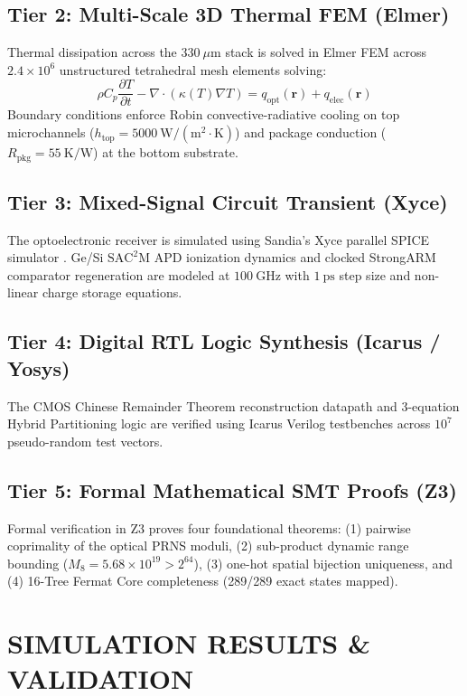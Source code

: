 \documentclass[journal]{IEEEtran}
\begin{document}
\subsection{Tier 2: Multi-Scale 3D Thermal FEM (Elmer)}
Thermal dissipation across the $330~\mu\mathrm{m}$ stack is solved in Elmer FEM \cite{Raback2013} across $2.4 \times 10^6$ unstructured tetrahedral mesh elements solving:
\begin{equation}
    \rho C_p \frac{\partial T}{\partial t} - \nabla \cdot (\kappa(T) \nabla T) = q_{\mathrm{opt}}(\mathbf{r}) + q_{\mathrm{elec}}(\mathbf{r})
\end{equation}
Boundary conditions enforce Robin convective-radiative cooling on top microchannels ($h_{\mathrm{top}} = 5000~\mathrm{W/(m^2\cdot K)}$) and package conduction ($R_{\mathrm{pkg}} = 55~\mathrm{K/W}$) at the bottom substrate.

\subsection{Tier 3: Mixed-Signal Circuit Transient (Xyce)}
The optoelectronic receiver is simulated using Sandia's Xyce parallel SPICE simulator \cite{Hutchinson2002}. Ge/Si $\mathrm{SAC^2M}$ APD ionization dynamics and clocked StrongARM comparator regeneration \cite{Razavi2015} are modeled at $100~\mathrm{GHz}$ with $1~\mathrm{ps}$ step size and non-linear charge storage equations.

\subsection{Tier 4: Digital RTL Logic Synthesis (Icarus / Yosys)}
The CMOS Chinese Remainder Theorem reconstruction datapath and 3-equation Hybrid Partitioning logic are verified using Icarus Verilog testbenches across $10^7$ pseudo-random test vectors.

\subsection{Tier 5: Formal Mathematical SMT Proofs (Z3)}
Formal verification in Z3 \cite{DeMoura2008} proves four foundational theorems: (1) pairwise coprimality of the optical PRNS moduli, (2) sub-product dynamic range bounding ($M_8 = 5.68 \times 10^{19} > 2^{64}$), (3) one-hot spatial bijection uniqueness, and (4) 16-Tree Fermat Core completeness (289/289 exact states mapped).

\section{SIMULATION RESULTS \& VALIDATION}
\end{document}
